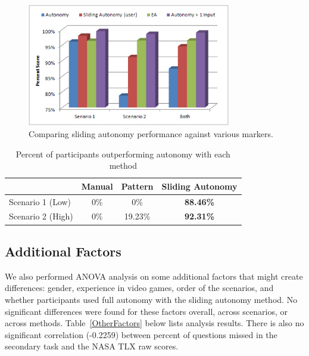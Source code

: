 \documentclass[journal]{IEEEtran}
\begin{document}
\begin{figure}
\centering
\includegraphics[width=3.5in]{PerformanceMarkers.JPG}
\caption{Comparing sliding autonomy performance against various markers.}
\label{PerformanceMarkers}
\end{figure}

\begin{table}
\caption{Percent of participants outperforming autonomy with each method}
	\centering
		\begin{tabular}
			{|l|c|c|c|}
			\hline
			 & Manual & Pattern & Sliding Autonomy \\
			\hline
			Scenario 1 (Low) & 0\% & 0\% & \textbf{88.46\%} \\
			\hline
			Scenario 2 (High) & 0\% & 19.23\% & \textbf{92.31\%} \\
			\hline			
		\end{tabular}
\label{CompareToFullAutonomy}
\end{table}

\subsection{Additional Factors}

We also performed ANOVA analysis on some additional factors that might create differences: gender, experience in video games, order of the scenarios, and whether participants used full autonomy with the sliding autonomy method. No significant differences were found for these factors overall, across scenarios, or across methods. Table~\ref{OtherFactors} below lists analysis results. There is also no significant correlation (-0.2259) between percent of questions missed in the secondary task and the NASA TLX raw scores.
\end{document}
